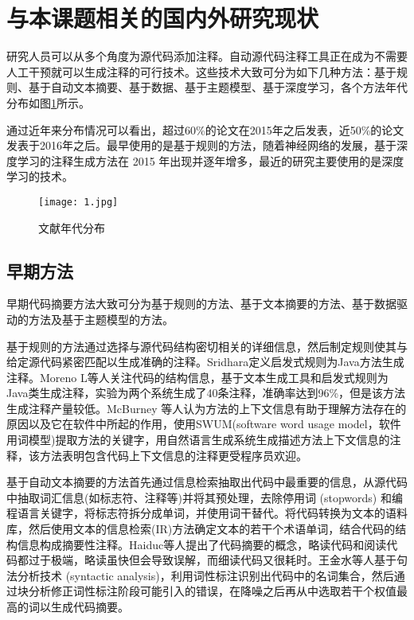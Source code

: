 \section{与本课题相关的国内外研究现状}
研究人员可以从多个角度为源代码添加注释。自动源代码注释工具正在成为不需要人工干预就可以生成注释的可行技术。这些技术大致可分为如下几种方法：基于规则、基于自动文本摘要、基于数据、基于主题模型、基于深度学习，各个方法年代分布如图\ref{fig: fig1}所示。

通过近年来分布情况可以看出，超过60\%的论文在2015年之后发表，近50\%的论文发表于2016年之后。最早使用的是基于规则的方法，随着神经网络的发展，基于深度学习的注释生成方法在 2015 年出现并逐年增多，最近的研究主要使用的是深度学习的技术。

\begin{figure}
	\centering
	\texttt{[image: 1.jpg]}
	\caption{文献年代分布}
	\label{fig: fig1}
\end{figure}

\subsection{早期方法}
早期代码摘要方法大致可分为基于规则的方法、基于文本摘要的方法、基于数据驱动的方法及基于主题模型的方法。

基于规则的方法通过选择与源代码结构密切相关的详细信息，然后制定规则使其与给定源代码紧密匹配以生成准确的注释。Sridhara定义启发式规则为Java方法生成注释\cite{sridhara2010towards}。Moreno L等人关注代码的结构信息，基于文本生成工具和启发式规则为Java类生成注释\cite{moreno2013automatic}，实验为两个系统生成了40条注释，准确率达到96\%，但是该方法生成注释产量较低。McBurney 等人认为方法的上下文信息有助于理解方法存在的原因以及它在软件中所起的作用，使用SWUM(software word usage model，软件用词模型)提取方法的关键字\cite{mcburney2014automatic}，用自然语言生成系统生成描述方法上下文信息的注释，该方法表明包含代码上下文信息的注释更受程序员欢迎。

基于自动文本摘要的方法首先通过信息检索抽取出代码中最重要的信息，从源代码中抽取词汇信息(如标志符、注释等)并将其预处理，去除停用词 (stopwords) 和编程语言关键字，将标志符拆分成单词，并使用词干替代。将代码转换为文本的语料库，然后使用文本的信息检索(IR)方法确定文本的若干个术语单词，结合代码的结构信息构成摘要性注释。Haiduc等人提出了代码摘要的概念\cite{haiduc2010use}，略读代码和阅读代码都过于极端，略读虽快但会导致误解，而细读代码又很耗时。王金水等人基于句法分析技术 (syntactic analysis)，利用词性标注识别出代码中的名词集合，然后通过块分析修正词性标注阶段可能引入的错误，在降噪之后再从中选取若干个权值最高的词以生成代码摘要\cite{wjs}。

